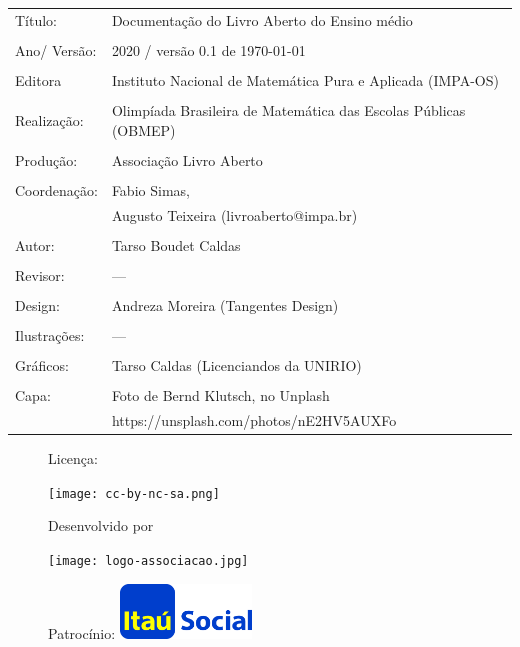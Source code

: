 \begin{tabular}{p{}p{}}
Título: & Documentação do Livro Aberto do Ensino médio\\
\\
Ano/ Versão: & 2020 / versão 0.1 de \today\\
\\
Editora & Instituto Nacional de Matem\'atica Pura e Aplicada (IMPA-OS)\\
\\
Realização:& Olimp\'iada Brasileira de Matem\'atica das Escolas P\'ublicas (OBMEP)\\
\\
Produção:& Associação Livro Aberto\\
\\
Coordenação:& Fabio Simas, \\
			& Augusto Teixeira (livroaberto@impa.br)\\
\\
  Autor: & Tarso Boudet Caldas\\
        
           
\\
Revisor: &  --- \\
            
\\
Design: & Andreza Moreira (Tangentes Design) \\
\\
  Ilustrações: & --- \\ 
\\
Gráficos: & Tarso Caldas (Licenciandos da UNIRIO)\\
\\
  Capa: & Foto de Bernd Klutsch, no Unplash \\
  		& https://unsplash.com/photos/nE2HV5AUXFo
\end{tabular}
\vspace{.5cm}


\begin{figure}[b]
\begin{minipage}[l]{5cm}
\centering

{\large Licença:}

  \texttt{[image: cc-by-nc-sa.png]}
\end{minipage}\hfill
\begin{minipage}[c]{5cm}
\centering
{\large Desenvolvido por}

\texttt{[image: logo-associacao.jpg]}
\end{minipage}
\begin{minipage}[r]{5cm}
\centering

{\large Patrocínio:}
  \vspace{1em}
  \includegraphics[width=3.5cm]{itau}
\end{minipage}
\end{figure}

